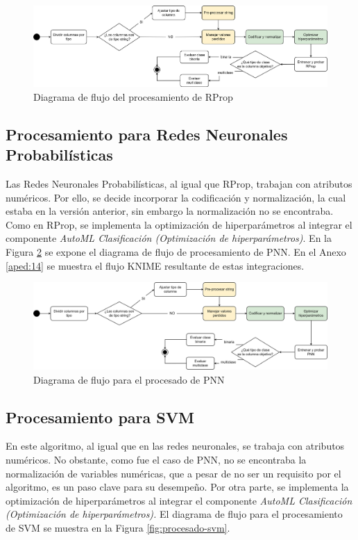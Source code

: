  \begin{figure}[H]
	\centering
	\includegraphics[width=1\linewidth]{"figuras/capi 2/modelos/procesado rprop.drawio"}
	\caption{Diagrama de flujo del procesamiento de RProp}
	\label{fig:procesado-rprop}
\end{figure}



\subsection{Procesamiento para Redes Neuronales Probabilísticas}
Las Redes Neuronales Probabilísticas, al igual que RProp, trabajan con atributos numéricos. Por ello, se decide incorporar la codificación y normalización, la cual estaba en la versión anterior, sin embargo la normalización no se encontraba. Como en RProp, se implementa la optimización de hiperparámetros al integrar el componente \textit{AutoML Clasificación (Optimización de hiperparámetros)}. En la Figura \ref{fig:procesado-pnn} se expone el diagrama de flujo de procesamiento de PNN. En el Anexo \ref{aped:14} se muestra el flujo KNIME resultante de estas integraciones.

\begin{figure}[H]
	\centering
	\includegraphics[width=1\linewidth]{"figuras/capi 2/modelos/procesado pnn.drawio"}
	\caption{Diagrama de flujo para el procesado de PNN}
	\label{fig:procesado-pnn}
\end{figure}


\subsection{Procesamiento para SVM}
En este algoritmo, al igual que en las redes neuronales, se trabaja con atributos numéricos. No obstante, como fue el caso de PNN, no se encontraba la normalización de variables numéricas, que a pesar de no ser un requisito por el algoritmo, es un paso clave para su desempeño. Por otra parte, se implementa la optimización de hiperparámetros al integrar el componente \textit{AutoML Clasificación (Optimización de hiperparámetros).} El diagrama de flujo para el procesamiento de SVM se muestra en la Figura \ref{fig:procesado-svm}.

